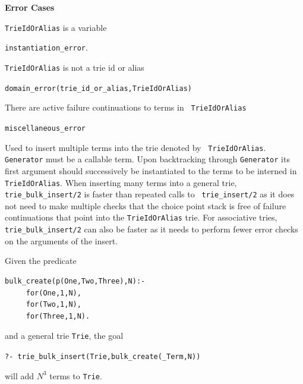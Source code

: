 \begin{description}
{\bf Error Cases}
\bi
\item 	{\tt TrieIdOrAlias} is a variable
\bi
\item 	{\tt instantiation\_error}.
\ei
\item 	{\tt TrieIdOrAlias} is not a trie id or alias
\bi
\item 	{\tt domain\_error(trie\_id\_or\_alias,TrieIdOrAlias)}
\ei
\item There are active failure continuations to terms in {\tt
  TrieIdOrAlias}
\bi
\item 	{\tt miscellaneous\_error}
\ei
 \ei

% 
Used to insert multiple terms into the trie denoted by {\tt
  TrieIdOrAlias}.  {\tt Generator} must be a callable term.  Upon
backtracking through {\tt Generator} its first argument should
successively be instantiated to the terms to be interned in {\tt
  TrieIdOrAlias}.  When inserting many terms into a general trie, {\tt
  trie\_bulk\_insert/2} is faster than repeated calls to {\tt
  trie\_insert/2} as it does not need to make multiple checks that the
choice point stack is free of failure continuations that point into
the {\tt TrieIdOrAlias} trie.  For associative tries, {\tt
  trie\_bulk\_insert/2} can also be faster as it needs to perform
fewer error checks on the arguments of the insert.

\begin{example} \rm
Given the predicate 
\begin{verbatim}
bulk_create(p(One,Two,Three),N):- 
     for(One,1,N),
     for(Two,1,N),
     for(Three,1,N).
\end{verbatim}
and a general trie {\tt Trie}, the goal 
\begin{center}
   {\tt ?- trie\_bulk\_insert(Trie,bulk\_create(\_Term,N))} 
\end{center}
will add $N^3$ terms to {\tt Trie}.
\end{example}


\end{description}

